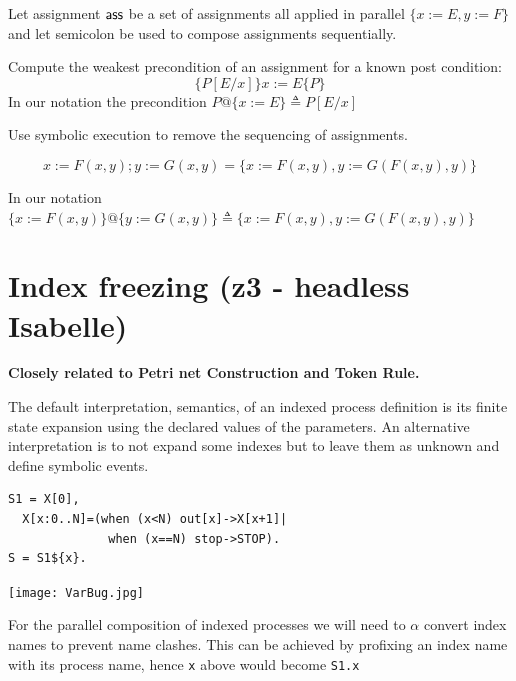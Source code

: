 \documentclass[]{article}
\begin{document}
Let assignment ${\sf ass}$ be a set of assignments all applied in parallel $\{x:=E,y:=F\}$ and let semicolon be used to compose assignments sequentially.

Compute the weakest precondition of an assignment for a known post condition:
\[ \{P[E/x]\} x:=E \{P\} \]
In our notation the precondition  $P@\{x:=E\}\triangleq P[E/x]$

Use symbolic execution to remove the sequencing of assignments.

\[ x:=F(x,y); y:=G(x,y)  = \{x:=F(x,y), y:=G(F(x,y),y)\}\]

In our notation $  \{x:=F(x,y)\}@\{y:=G(x,y)\}  \triangleq  \{x:=F(x,y), y:=G(F(x,y),y)\}$


\section{ Index freezing   (z3  -  headless Isabelle)}

{\bf Closely related to Petri net Construction and Token Rule.}

The default interpretation, semantics, of an indexed process definition is its finite state expansion using the declared values of the parameters. An alternative interpretation is to not expand some indexes but to leave them as unknown and define symbolic events.


\begin{minipage}{0.55\textwidth}
\begin{verbatim}
S1 = X[0],
  X[x:0..N]=(when (x<N) out[x]->X[x+1]|
              when (x==N) stop->STOP).
S = S1${x}.
   \end{verbatim}
\end{minipage}\begin{minipage}{0.4\textwidth}
\begin{center}\texttt{[image: VarBug.jpg]}\end{center}
\end{minipage}



For the parallel composition of indexed processes we will need to $\alpha$ convert index names to prevent name clashes. This can be achieved by profixing an index name with its process name, hence \verb|x| above would become \verb|S1.x|
\end{document}
